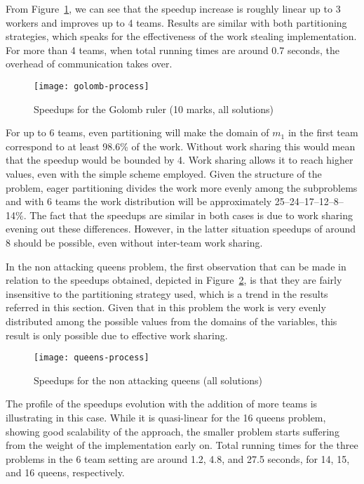 \documentclass{llncs}
\begin{document}
From Figure~\ref{gra:golomb:process:speedups}, we can see that the
speedup increase is roughly linear up to 3 workers and improves up to
4 teams. Results are similar with both partitioning strategies, which
speaks for the effectiveness of the work stealing implementation. For
more than 4 teams, when total running times are around 0.7 seconds,
the overhead of communication takes over.

\begin{figure}[ht]
  \centering
  \hspace{-7pt}\texttt{[image: golomb-process]}
  \caption{Speedups for the Golomb ruler (10 marks, all solutions)}
  \label{gra:golomb:process:speedups}
\end{figure}

For up to 6 teams, even partitioning will make the domain of $m_1$ in
the first team correspond to at least 98.6\% of the work. Without work
sharing this would mean that the speedup would be bounded by 4. Work
sharing allows it to reach higher values, even with the simple scheme
employed. Given the structure of the problem, eager partitioning
divides the work more evenly among the subproblems and with 6 teams
the work distribution will be approximately 25--24--17--12--8--14\%.
The fact that the speedups are similar in both cases is due to work
sharing evening out these differences. However, in the latter
situation speedups of around 8 should be possible, even without
inter-team work sharing.

In the non attacking queens problem, the first observation that can be
made in relation to the speedups obtained, depicted in
Figure~\ref{gra:queens:process:speedups}, is that they are fairly
insensitive to the partitioning strategy used, which is a trend in the
results referred in this section. Given that in this problem the work
is very evenly distributed among the possible values from the domains
of the variables, this result is only possible due to effective work
sharing.

\begin{figure}[ht]
  \centering
  \hspace{-7pt}\texttt{[image: queens-process]}
  \caption{Speedups for the non attacking queens (all solutions)\protect\footnotemark}
  \label{gra:queens:process:speedups}
\end{figure}

The profile of the speedups evolution with the addition of more teams
is illustrating in this case. While it is quasi-linear for the 16
queens problem, showing good scalability of the approach, the smaller
problem starts suffering from the weight of the implementation early
on. Total running times for the three problems in the 6 team setting
are around 1.2, 4.8, and 27.5 seconds, for 14, 15, and 16 queens,
respectively.
\end{document}
